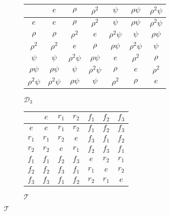 \begin{solution}
    \begin{figure}[H]
      \centering
      \begin{subfigure}[b]{0.48\textwidth}
        \centering
        \begin{tabular}{c|cccccc}
          & $e$ & $\rho$ & $\rho^2$ & $\psi$ & $\rho\psi$ & $\rho^2\psi$ \\
          \hline
          $e$ & $e$ & $\rho$ & $\rho^2$ & $\psi$ & $\rho\psi$ & $\rho^2\psi$ \\
          $\rho$ & $\rho$ & $\rho^2$ & $e$ & $\rho^2\psi$ & $\psi$ & $\rho\psi$ \\
          $\rho^2$ & $\rho^2$ & $e$ & $\rho$ & $\rho\psi$ & $\rho^2\psi$ & $\psi$ \\
          $\psi$ & $\psi$ & $\rho^2\psi$ & $\rho\psi$ & $e$ & $\rho^2$ & $\rho$ \\
          $\rho\psi$ & $\rho\psi$ & $\psi$ & $\rho^2\psi$ & $\rho$ & $e$ & $\rho^2$ \\
          $\rho^2\psi$ & $\rho^2\psi$ & $\rho\psi$ & $\psi$ & $\rho^2$ & $\rho$ & $e$
        \end{tabular}
        \caption{$\mathcal{D}_3$}
      \end{subfigure}
      \hfill 
      \begin{subfigure}[b]{0.48\textwidth}
        \centering
        \begin{tabular}{c|cccccc}
          & $e$ & $r_1$ & $r_2$ & $f_1$ & $f_2$ & $f_3$ \\
          \hline
          $e$ & $e$ & $r_1$ & $r_2$ & $f_1$ & $f_2$ & $f_3$ \\
          $r_1$ & $r_1$ & $r_2$ & $e$ & $f_3$ & $f_1$ & $f_2$ \\
          $r_2$ & $r_2$ & $e$ & $r_1$ & $f_2$ & $f_3$ & $f_1$ \\
          $f_1$ & $f_1$ & $f_2$ & $f_3$ & $e$ & $r_2$ & $r_1$ \\
          $f_2$ & $f_2$ & $f_3$ & $f_1$ & $r_1$ & $e$ & $r_2$ \\
          $f_3$ & $f_3$ & $f_1$ & $f_2$ & $r_2$ & $r_1$ & $e$
        \end{tabular}
        \caption{$\mathcal{T}$}
      \end{subfigure}
    \end{figure}


\end{solution}
